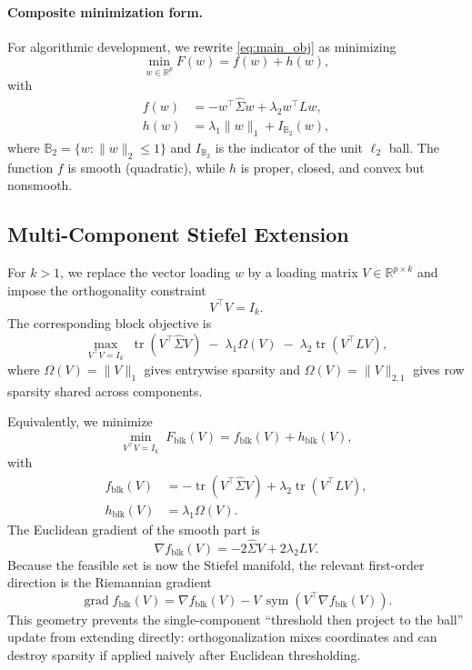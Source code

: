 \documentclass[10pt,twocolumn,letterpaper]{article}
\theoremstyle{definition}
\newcommand{\R}{\mathbb{R}}
\newcommand{\Sigmahat}{\widehat{\Sigma}}
\DeclareMathOperator{\tr}{tr}
\DeclareMathOperator{\sym}{sym}
\begin{document}
\paragraph{Composite minimization form.}
For algorithmic development, we rewrite \eqref{eq:main_obj} as minimizing
\begin{equation}
\min_{w\in\R^p} F(w)= f(w)+h(w),
\end{equation}
with
\begin{align}
  f(w) &= - w^\top \Sigmahat w + \lambda_2 w^\top L w, \\
  h(w) &= \lambda_1\|w\|_1 + I_{\mathbb{B}_2}(w),
\end{align}
where $\mathbb{B}_2=\{w:\|w\|_2\le 1\}$ and $I_{\mathbb{B}_2}$ is the indicator of the unit $\ell_2$ ball. The function $f$ is smooth (quadratic), while $h$ is proper, closed, and convex but nonsmooth.

\subsection{Multi-Component Stiefel Extension}
For $k>1$, we replace the vector loading $w$ by a loading matrix $V\in\R^{p\times k}$ and impose the orthogonality constraint
\begin{equation}
V^\top V = I_k.
\end{equation}
The corresponding block objective is
\begin{equation}
\label{eq:block_obj}
\max_{V^\top V = I_k}\;
\tr(V^\top \Sigmahat V)
\;-\;
\lambda_1 \Omega(V)
\;-\;
\lambda_2 \tr(V^\top L V),
\end{equation}
where $\Omega(V)=\|V\|_1$ gives entrywise sparsity and $\Omega(V)=\|V\|_{2,1}$ gives row sparsity shared across components.

Equivalently, we minimize
\begin{equation}
\min_{V^\top V = I_k}\; F_{\mathrm{blk}}(V)=f_{\mathrm{blk}}(V)+h_{\mathrm{blk}}(V),
\end{equation}
with
\begin{align}
f_{\mathrm{blk}}(V) &= -\tr(V^\top \Sigmahat V) + \lambda_2 \tr(V^\top L V), \\
h_{\mathrm{blk}}(V) &= \lambda_1 \Omega(V).
\end{align}
The Euclidean gradient of the smooth part is
\begin{equation}
\nabla f_{\mathrm{blk}}(V) = -2\Sigmahat V + 2\lambda_2 L V.
\end{equation}
Because the feasible set is now the Stiefel manifold, the relevant first-order direction is the Riemannian gradient
\begin{equation}
\operatorname{grad} f_{\mathrm{blk}}(V)
=
\nabla f_{\mathrm{blk}}(V) - V\,\sym\!\left(V^\top \nabla f_{\mathrm{blk}}(V)\right).
\end{equation}
This geometry prevents the single-component ``threshold then project to the ball'' update from extending directly: orthogonalization mixes coordinates and can destroy sparsity if applied naively after Euclidean thresholding.
\end{document}
